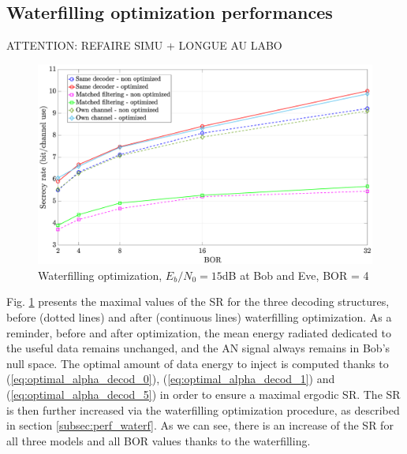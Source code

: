 \documentclass[journal,comsoc]{IEEEtran}
\let\MYoriglatexcaption\caption
\renewcommand{\caption}[2][\relax]{\MYoriglatexcaption[#2]{#2}}
\begin{document}
\subsection{Waterfilling optimization performances}
{\color{red}  ATTENTION: REFAIRE SIMU + LONGUE AU LABO}

\begin{figure}[h!t]
	\centering
	\includegraphics[width=1\linewidth]{graphs/SISO_no_corr_waterfilling.eps}
	\caption{Waterfilling optimization, $E_b/N_0 = 15$dB at Bob and Eve, BOR = 4}
	\label{fig_waterfilling_opt}
\end{figure}
Fig. \ref{fig_waterfilling_opt} presents the maximal values of the SR for the three decoding structures, before (dotted lines) and after (continuous lines) waterfilling optimization. As a reminder, before and after optimization, the mean energy radiated dedicated to the useful data remains unchanged, and the AN signal always remains in Bob's null space. The optimal amount of data energy to inject is computed thanks to (\ref{eq:optimal_alpha_decod_0}), (\ref{eq:optimal_alpha_decod_1}) and (\ref{eq:optimal_alpha_decod_5}) in order to ensure a maximal ergodic SR. The SR is then further increased via the waterfilling optimization procedure, as described in section \ref{subsec:perf_waterf}. As we can see, there is an increase of the SR for all three models and all BOR values thanks to the waterfilling. 

\end{document}
